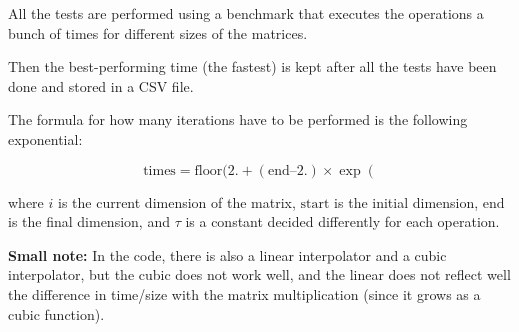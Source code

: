 \documentclass{article}
\begin{document}
All the tests are performed using a benchmark that executes the operations a bunch of times for different sizes of the matrices.

Then the best-performing time (the fastest) is kept after all the tests have been done and stored in a CSV file.

The formula for how many iterations have to be performed is the following exponential:

\[\text{times} = \text{floor}(2. + (\text{end} – 2.) \times \exp\left(\]

where \(i\) is the current dimension of the matrix, \(\text{{start}}\) is the initial dimension, \(\text{{end}}\) is the final dimension, and \(\tau\) is a constant decided differently for each operation.

\textbf{Small note:} In the code, there is also a linear interpolator and a cubic interpolator, but the cubic does not work well, and the linear does not reflect well the difference in time/size with the matrix multiplication (since it grows as a cubic function).
\end{document}

